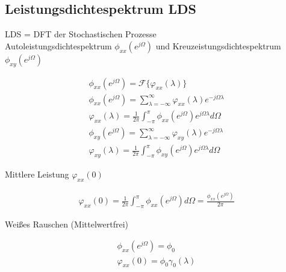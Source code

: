 \documentclass[10pt,a4paper]{article}
\begin{document}
\subsection{Leistungsdichtespektrum LDS}
LDS = DFT der Stochastischen Prozesse \\
Autoleistungsdichtespektrum  $\phi_{xx}(e^{j\Omega})$ und Kreuzeistungsdichtespektrum $\phi_{xy}(e^{j\Omega})$
  \begin{mdframed}[style=exercise]
    \begin{align}
        \phi_{xx}(e^{j\Omega}) = \mathcal{F}\{ \varphi_{xx}(\lambda)\} \\
        \phi_{xx}(e^{j\Omega}) = \sum_{\lambda=-\infty}^{\infty} \varphi_{xx}(\lambda) e^{-j\Omega\lambda} \\
        \varphi_{xx}(\lambda) = \frac{1}{2\pi} \displaystyle\int_{-\pi}^{\pi} \phi_{xx}(e^{j\Omega})e^{j\Omega\lambda}d\Omega \\
        \phi_{xy}(e^{j\Omega}) = \sum_{\lambda=-\infty}^{\infty} \varphi_{xy}(\lambda) e^{-j\Omega\lambda} \\
        \varphi_{xy}(\lambda) = \frac{1}{2\pi} \displaystyle\int_{-\pi}^{\pi} \phi_{xy}(e^{j\Omega})e^{j\Omega\lambda}d\Omega
    \end{align}
  \end{mdframed}
Mittlere Leistung $\varphi_{xx}(0)$
  \begin{mdframed}[style=exercise]
    \begin{align}
        \varphi_{xx}(0) = \frac{1}{2\pi} \displaystyle\int_{-\pi}^{\pi} \phi_{xx}(e^{j\Omega})d\Omega  = \frac{\phi_{xx}(e^{j\Omega})}{2\pi}
    \end{align}
  \end{mdframed}
Weißes Rauschen (Mittelwertfrei) 
  \begin{mdframed}[style=exercise]
    \begin{align}
        \phi_{xx}(e^{j\Omega}) = \phi_0\\
        \varphi_{xx}(0) = \phi_0 \gamma_0(\lambda)
    \end{align}
  \end{mdframed}
\end{document}
